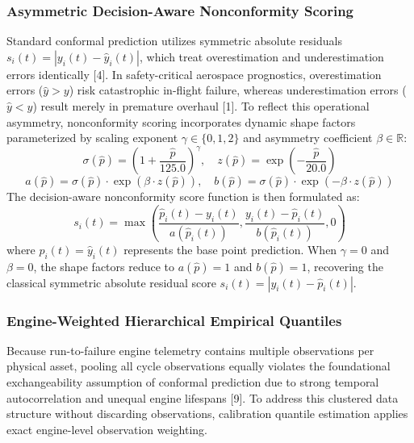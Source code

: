 \documentclass[12pt,a4paper]{article}
\begin{document}
\subsubsection*{Asymmetric Decision-Aware Nonconformity Scoring}
Standard conformal prediction utilizes symmetric absolute residuals $s_i(t) = |y_i(t) - \hat{y}_i(t)|$, which treat overestimation and underestimation errors identically [4]. In safety-critical aerospace prognostics, overestimation errors ($\hat{y} > y$) risk catastrophic in-flight failure, whereas underestimation errors ($\hat{y} < y$) result merely in premature overhaul [1]. To reflect this operational asymmetry, nonconformity scoring incorporates dynamic shape factors parameterized by scaling exponent $\gamma \in \{0, 1, 2\}$ and asymmetry coefficient $\beta \in \mathbb{R}$:
\begin{equation}
\sigma(\hat{p}) = \left(1 + \frac{\hat{p}}{125.0}\right)^\gamma, \quad z(\hat{p}) = \exp\left(-\frac{\hat{p}}{20.0}\right)
\end{equation}
\begin{equation}
a(\hat{p}) = \sigma(\hat{p}) \cdot \exp(\beta \cdot z(\hat{p})), \quad b(\hat{p}) = \sigma(\hat{p}) \cdot \exp(-\beta \cdot z(\hat{p}))
\end{equation}
The decision-aware nonconformity score function is then formulated as:
\begin{equation}
s_i(t) = \max\left( \frac{\hat{p}_i(t) - y_i(t)}{a(\hat{p}_i(t))}, \frac{y_i(t) - \hat{p}_i(t)}{b(\hat{p}_i(t))}, 0 \right)
\end{equation}
where $\hat{p}_i(t) = \hat{y}_i(t)$ represents the base point prediction. When $\gamma = 0$ and $\beta = 0$, the shape factors reduce to $a(\hat{p}) = 1$ and $b(\hat{p}) = 1$, recovering the classical symmetric absolute residual score $s_i(t) = |y_i(t) - \hat{p}_i(t)|$.

\subsubsection*{Engine-Weighted Hierarchical Empirical Quantiles}
Because run-to-failure engine telemetry contains multiple observations per physical asset, pooling all cycle observations equally violates the foundational exchangeability assumption of conformal prediction due to strong temporal autocorrelation and unequal engine lifespans [9]. To address this clustered data structure without discarding observations, calibration quantile estimation applies exact engine-level observation weighting.
\end{document}
